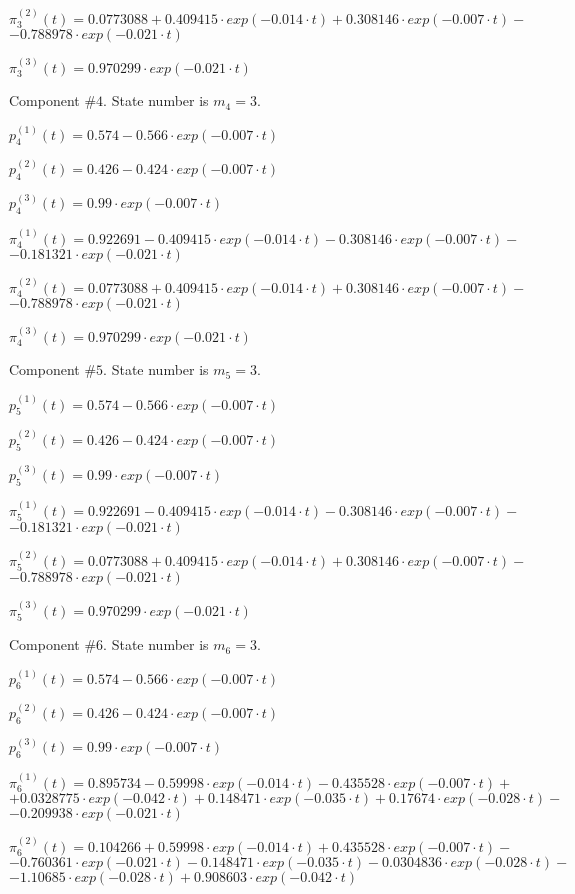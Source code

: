  $\pi^{(2)}_3(t)=0.0773088+0.409415\cdot exp(-0.014\cdot t)+0.308146\cdot exp(-0.007\cdot t)-$
$-0.788978\cdot exp(-0.021\cdot t)$

 $\pi^{(3)}_3(t)=0.970299\cdot exp(-0.021\cdot t)$

 Component #$4$. State number is $m_4=3$.

 $p^{(1)}_4(t)=0.574-0.566\cdot exp(-0.007\cdot t)$

 $p^{(2)}_4(t)=0.426-0.424\cdot exp(-0.007\cdot t)$

 $p^{(3)}_4(t)=0.99\cdot exp(-0.007\cdot t)$

 $\pi^{(1)}_4(t)=0.922691-0.409415\cdot exp(-0.014\cdot t)-0.308146\cdot exp(-0.007\cdot t)-$
$-0.181321\cdot exp(-0.021\cdot t)$

 $\pi^{(2)}_4(t)=0.0773088+0.409415\cdot exp(-0.014\cdot t)+0.308146\cdot exp(-0.007\cdot t)-$
$-0.788978\cdot exp(-0.021\cdot t)$

 $\pi^{(3)}_4(t)=0.970299\cdot exp(-0.021\cdot t)$

 Component #$5$. State number is $m_5=3$.

 $p^{(1)}_5(t)=0.574-0.566\cdot exp(-0.007\cdot t)$

 $p^{(2)}_5(t)=0.426-0.424\cdot exp(-0.007\cdot t)$

 $p^{(3)}_5(t)=0.99\cdot exp(-0.007\cdot t)$

 $\pi^{(1)}_5(t)=0.922691-0.409415\cdot exp(-0.014\cdot t)-0.308146\cdot exp(-0.007\cdot t)-$
$-0.181321\cdot exp(-0.021\cdot t)$

 $\pi^{(2)}_5(t)=0.0773088+0.409415\cdot exp(-0.014\cdot t)+0.308146\cdot exp(-0.007\cdot t)-$
$-0.788978\cdot exp(-0.021\cdot t)$

 $\pi^{(3)}_5(t)=0.970299\cdot exp(-0.021\cdot t)$

 Component #$6$. State number is $m_6=3$.

 $p^{(1)}_6(t)=0.574-0.566\cdot exp(-0.007\cdot t)$

 $p^{(2)}_6(t)=0.426-0.424\cdot exp(-0.007\cdot t)$

 $p^{(3)}_6(t)=0.99\cdot exp(-0.007\cdot t)$

 $\pi^{(1)}_6(t)=0.895734-0.59998\cdot exp(-0.014\cdot t)-0.435528\cdot exp(-0.007\cdot t)+$
$+0.0328775\cdot exp(-0.042\cdot t)+0.148471\cdot exp(-0.035\cdot t)+0.17674\cdot exp(-0.028\cdot t)-$
$-0.209938\cdot exp(-0.021\cdot t)$

 $\pi^{(2)}_6(t)=0.104266+0.59998\cdot exp(-0.014\cdot t)+0.435528\cdot exp(-0.007\cdot t)-$
$-0.760361\cdot exp(-0.021\cdot t)-0.148471\cdot exp(-0.035\cdot t)-0.0304836\cdot exp(-0.028\cdot t)-$
$-1.10685\cdot exp(-0.028\cdot t)+0.908603\cdot exp(-0.042\cdot t)$

